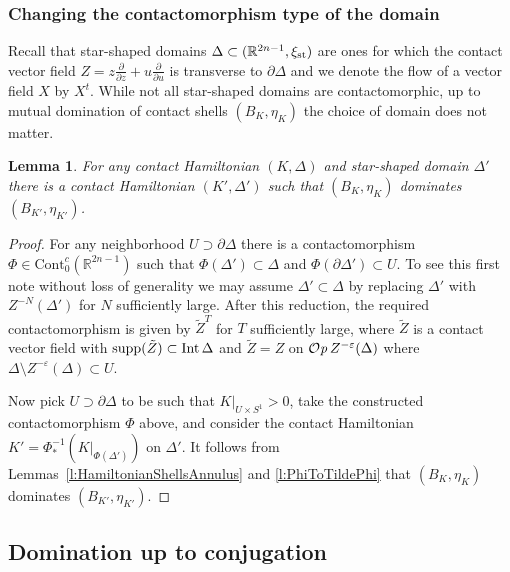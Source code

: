\documentclass[12pt]{paper}
\theoremstyle{plain}
\newtheorem{lemma}[theorem]{Lemma}
\theoremstyle{definition}
\newcommand{\p}{\partial}
\newcommand{\eps}{\varepsilon}
\newcommand{\R}{{\mathbb{R}}}
\newcommand{\st}{{\rm st}}
\newcommand{\Int}{{\rm Int\,}} %
\newcommand{\supp}{{\rm supp}}
\newcommand{\CCont}{\mathrm{Cont}}
\def\Op{{\mathcal O}{\it p}\,}
\numberwithin{figure}{section}
\begin{document}
\subsubsection{Changing the contactomorphism type of the domain}

Recall that star-shaped domains $\Delta \subset (\R^{2n-1}, \xi_\st)$ are ones for which the contact vector field
$Z = z \tfrac{\p}{\p z} + u \tfrac{\p}{\p u}$ is transverse to $\p\Delta$ and we denote the flow of a vector field $X$ by $X^t$.
While not all star-shaped domains are contactomorphic, up to mutual domination of contact shells $(B_K, \eta_K)$
the choice of domain does not matter.

 \begin{lemma}\label{lm:changing-B}
 For any contact Hamiltonian $(K, \Delta)$ and star-shaped domain $\Delta'$ there is a
 contact Hamiltonian $(K', \Delta')$ such that $(B_K, \eta_K)$ dominates $(B_{K'}, \eta_{K'})$.
 \end{lemma}
 \begin{proof}
 For any neighborhood $U\supset \p \Delta$ there is a contactomorphism $\Phi \in \CCont_0^c(\R^{2n-1})$
 such that $\Phi(\Delta') \subset \Delta$ and $\Phi(\p \Delta')\subset U$.  
 To see this first note without loss of generality we may assume $\Delta' \subset \Delta$ by replacing $\Delta'$
 with $Z^{-N}(\Delta')$ for $N$ sufficiently large.
 After this reduction, the required contactomorphism is given by $\tilde{Z}^T$ for $T$ sufficiently large,
 where $\tilde{Z}$ is a contact vector field with $\supp(\tilde{Z}) \subset \Int \Delta$
 and $\tilde{Z} = Z$ on $\Op Z^{-\eps}(\Delta)$ where $\Delta \setminus Z^{-\eps}(\Delta) \subset U$.
 
 Now pick $U \supset \p \Delta$ to be such that $K|_{U \times S^1} > 0$, take the constructed contactomorphism $\Phi$ above,
 and consider the contact Hamiltonian $K' = \Phi^{-1}_*(K|_{\Phi(\Delta')})$ on $\Delta'$.  It follows from 
 Lemmas~\ref{l:HamiltonianShellsAnnulus} and \ref{l:PhiToTildePhi} that $(B_K, \eta_K)$ dominates $(B_{K'}, \eta_{K'})$.
 \end{proof}


\subsection{Domination up to conjugation}\label{sec:domin}

\end{document}
